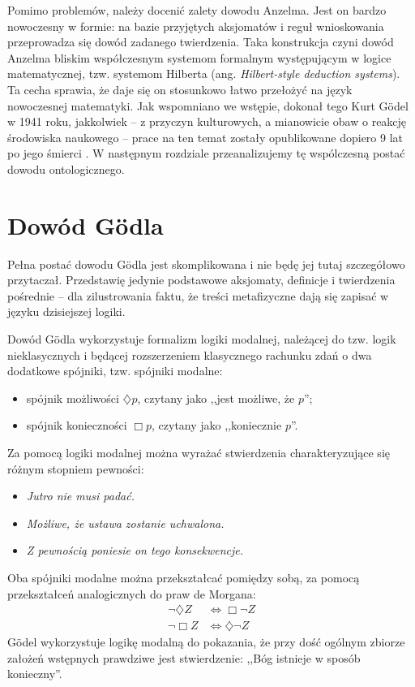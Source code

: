 \documentclass{eiti-raport}
\begin{document}
Pomimo problemów, należy docenić zalety dowodu Anzelma. Jest on bardzo nowoczesny w formie: na bazie przyjętych aksjomatów i reguł wnioskowania przeprowadza się dowód zadanego twierdzenia. Taka konstrukcja czyni dowód Anzelma bliskim współczesnym systemom formalnym występującym w logice matematycznej, tzw. systemom Hilberta (ang. \textit{Hilbert-style deduction systems}). Ta cecha sprawia, że daje się on stosunkowo łatwo przełożyć na język nowoczesnej matematyki. Jak wspomniano we wstępie, dokonał tego Kurt G\"odel w 1941 roku, jakkolwiek -- z przyczyn kulturowych, a mianowicie obaw o reakcję środowiska naukowego -- prace na ten temat zostały opublikowane dopiero 9 lat po jego śmierci \cite{goedel1995}. W następnym rozdziale przeanalizujemy tę wspólczesną postać dowodu ontologicznego. 

\section{Dowód G\"odla}
Pełna postać dowodu G\"odla jest skomplikowana i nie będę jej tutaj szczegółowo przytaczał. Przedstawię jedynie podstawowe aksjomaty, definicje i twierdzenia pośrednie -- dla zilustrowania faktu, że treści metafizyczne dają się zapisać w języku dzisiejszej logiki. 

Dowód G\"odla wykorzystuje formalizm logiki modalnej, należącej do tzw. logik nieklasycznych i będącej rozszerzeniem klasycznego rachunku zdań o dwa dodatkowe spójniki, tzw. spójniki modalne: 
\begin{itemize}
	\item spójnik możliwości $\diamondsuit p$, czytany jako ,,jest możliwe, że $p$'';
	\item spójnik konieczności $\Box p$, czytany jako ,,koniecznie $p$''.
\end{itemize} 
Za pomocą logiki modalnej można wyrażać stwierdzenia charakteryzujące się różnym stopniem pewności: 
\begin{itemize}
	\item \emph{Jutro nie musi padać.}
	\item \emph{Możliwe, że ustawa zostanie uchwalona.}
	\item \emph{Z pewnością poniesie on tego konsekwencje.}
\end{itemize}
Oba spójniki modalne można przekształcać pomiędzy sobą, za pomocą przekształceń analogicznych do praw de Morgana:
\begin{align*}
	\neg \diamondsuit Z & \Leftrightarrow \Box \neg Z \\ 
	\neg \Box Z & \Leftrightarrow \diamondsuit \neg Z
\end{align*}
G\"odel wykorzystuje logikę modalną do pokazania, że przy dość ogólnym zbiorze założeń wstępnych prawdziwe jest stwierdzenie: ,,Bóg istnieje w sposób konieczny''. 
\end{document}
